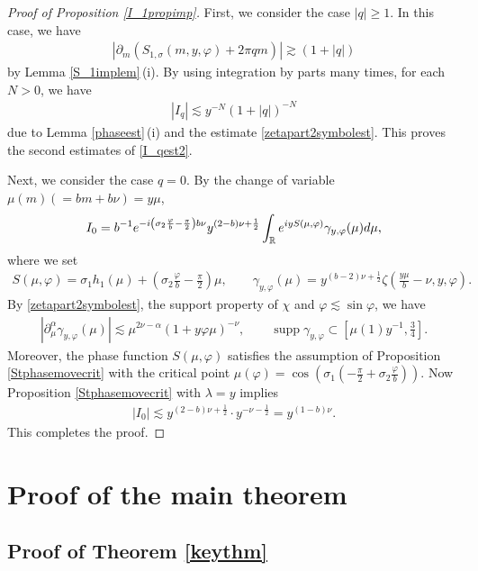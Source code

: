 \documentclass[10pt,a4paper]{article}
\numberwithin{equation}{section}
\def\R{\mathbb{R}}%
\DeclareMathOperator{\supp}{supp}%
\def\a{\alpha}
\def\c{\gamma}
\def\f{\varphi}
\def\l{\lambda}
\def\m{\mu}
\def\n{\nu}
\def\s{\sigma}
\def\z{\zeta}
\def\pa{\partial}
\begin{document}
\begin{proof}[Proof of Proposition \ref{I_1propimp}]
First, we consider the case $|q|\geq 1$. In this case, we have
\begin{align*}
|\pa_m(S_{1,\s}(m,y,\f)+2\pi qm)|\gtrsim (1+|q|)
\end{align*}
by Lemma \ref{S_1implem}\,(i).
By using integration by parts many times, for each $N>0$, we have
\begin{align*}
|I_q|\lesssim y^{-N}(1+|q|)^{-N}
\end{align*}
due to Lemma \ref{phaseest}\,(i) and the estimate \eqref{zetapart2symbolest}.
This proves the second estimates of \eqref{I_qest2}.

Next, we consider the case $q=0$. By the change of variable $\m(m)(=bm+b\n)=y\m$,
\[%
I_0=b^{-1}{\rm e}^{-{\rm i}\left(\s_2\frac{\f}{b}-\frac{\pi}{2}\right)b\n} y^{(2-b)\n+\frac{1}{2}}\int_{\R}{\rm e}^{{\rm i}yS(\m,\f) }\c_{y,\f}(\m) {\rm d}\m,
\]
where we set
\begin{align*}
S(\m,\f)=\s_1h_1(\m) +\left(\s_2\frac{\f}{b}-\frac{\pi}{2}\right)\m,\qquad \c_{y,\f}(\m)=y^{(b-2)\n+\frac{1}{2}}\z\left(\frac{y\m}{b}-\n,y,\f\right).
\end{align*}
By \eqref{zetapart2symbolest}, the support property of $\chi$ and $\f\lesssim\sin \f$, we have
\begin{align*}
|\pa_{\m}^{\a}\c_{y,\f}(\m)|\lesssim \m^{2\n-\a}(1+y \f\m)^{-\n},\qquad \supp \c_{y,\f}\subset \left[\m(1)y^{-1},\frac{3}{4}\right].
\end{align*}
Moreover, the phase function $S(\m,\f)$ satisfies the assumption of Proposition \ref{Stphasemovecrit} with the critical point $\m(\f)=\cos\left(\s_1\left(-\frac{\pi}{2}+\s_2\frac{\f}{b}\right)\right)$.
Now Proposition \ref{Stphasemovecrit} with $\l=y$ implies
\begin{align*}
|I_0|\lesssim y^{(2-b)\n+\frac{1}{2}}\cdot y^{-\n-\frac{1}{2}}=y^{(1-b)\n}.
\end{align*}
This completes the proof.
\end{proof}





\section{Proof of the main theorem}\label{proofsection}





\subsection{Proof of Theorem \ref{keythm}}
\label{subsec:proof}
\end{document}
